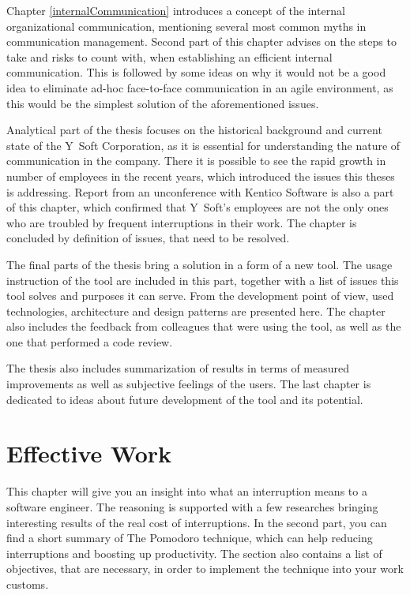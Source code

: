 \documentclass[11pt,singleside]{myfithesis2}
\begin{document}
Chapter \ref{internalCommunication} introduces a concept of the internal organizational communication, mentioning several most common myths in communication management. Second part of this chapter advises on the steps to take and risks to count with, when establishing an efficient internal communication. This is followed by some ideas on why it would not be a good idea to eliminate ad-hoc face-to-face communication in an agile environment, as this would be the simplest solution of the aforementioned issues.

Analytical part of the thesis focuses on the historical background and current state of the Y~Soft Corporation, as it is essential for understanding the nature of communication in the company. There it is possible to see the rapid growth in number of employees in the recent years, which introduced the issues this theses is addressing. Report from an unconference with Kentico Software is also a part of this chapter, which confirmed that Y~Soft's employees are not the only ones who are troubled by frequent interruptions in their work. The chapter is concluded by definition of issues, that need to be resolved.

The final parts of the thesis bring a solution in a form of a new tool. The usage instruction of the tool are included in this part, together with a list of issues this tool solves and purposes it can serve. From the development point of view, used technologies, architecture and design patterns are presented here. The chapter also includes the feedback from colleagues that were using the tool, as well as the one that performed a code review.

The thesis also includes summarization of results in terms of measured improvements as well as subjective feelings of the users. The last chapter is dedicated to ideas about future development of the tool and its potential.


\chapter{Effective Work}

This chapter will give you an insight into what an interruption means to a software engineer. The reasoning is supported with a few researches bringing interesting results of the real cost of interruptions. In the second part, you can find a short summary of The Pomodoro technique, which can help reducing interruptions and boosting up productivity. The section also contains a list of objectives, that are necessary, in order to implement the technique into your work customs.
\end{document}
